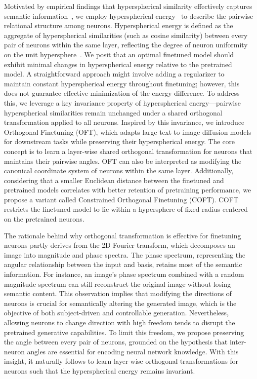 Motivated by empirical findings that hyperspherical similarity effectively captures semantic information~\cite{liu2017deep,liu2018decoupled,chen2020angular}, we employ hyperspherical energy~\cite{liu2018learning} to describe the pairwise relational structure among neurons. Hyperspherical energy is defined as the aggregate of hyperspherical similarities (such as cosine similarity) between every pair of neurons within the same layer, reflecting the degree of neuron uniformity on the unit hypersphere~\cite{liu2021learning}. We posit that an optimal finetuned model should exhibit minimal changes in hyperspherical energy relative to the pretrained model. A straightforward approach might involve adding a regularizer to maintain constant hyperspherical energy throughout finetuning; however, this does not guarantee effective minimization of the energy difference. To address this, we leverage a key invariance property of hyperspherical energy—pairwise hyperspherical similarities remain unchanged under a shared orthogonal transformation applied to all neurons. Inspired by this invariance, we introduce Orthogonal Finetuning (OFT), which adapts large text-to-image diffusion models for downstream tasks while preserving their hyperspherical energy. The core concept is to learn a layer-wise shared orthogonal transformation for neurons that maintains their pairwise angles. OFT can also be interpreted as modifying the canonical coordinate system of neurons within the same layer. Additionally, considering that a smaller Euclidean distance between the finetuned and pretrained models correlates with better retention of pretraining performance, we propose a variant called Constrained Orthogonal Finetuning (COFT). COFT restricts the finetuned model to lie within a hypersphere of fixed radius centered on the pretrained neurons.

The rationale behind why orthogonal transformation is effective for finetuning neurons partly derives from the 2D Fourier transform, which decomposes an image into magnitude and phase spectra. The phase spectrum, representing the angular relationship between the input and basis, retains most of the semantic information. For instance, an image’s phase spectrum combined with a random magnitude spectrum can still reconstruct the original image without losing semantic content. This observation implies that modifying the directions of neurons is crucial for semantically altering the generated image, which is the objective of both subject-driven and controllable generation. Nevertheless, allowing neurons to change direction with high freedom tends to disrupt the pretrained generative capabilities. To limit this freedom, we propose preserving the angle between every pair of neurons, grounded on the hypothesis that inter-neuron angles are essential for encoding neural network knowledge. With this insight, it naturally follows to learn layer-wise orthogonal transformations for neurons such that the hyperspherical energy remains invariant.

